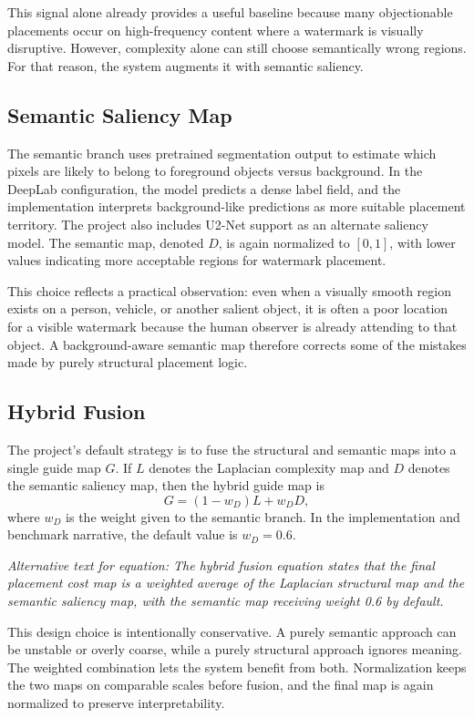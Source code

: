 \documentclass[12pt,oneside]{report}
\newcommand{\FormulaAlt}[1]{\par\small\textit{Alternative text for equation: #1}\normalsize}
\begin{document}
This signal alone already provides a useful baseline because many objectionable placements occur on high-frequency content where a watermark is visually disruptive. However, complexity alone can still choose semantically wrong regions. For that reason, the system augments it with semantic saliency.

\subsection{Semantic Saliency Map}
The semantic branch uses pretrained segmentation output to estimate which pixels are likely to belong to foreground objects versus background. In the DeepLab configuration, the model predicts a dense label field, and the implementation interprets background-like predictions as more suitable placement territory. The project also includes U2-Net support as an alternate saliency model. The semantic map, denoted $D$, is again normalized to $[0,1]$, with lower values indicating more acceptable regions for watermark placement.

This choice reflects a practical observation: even when a visually smooth region exists on a person, vehicle, or another salient object, it is often a poor location for a visible watermark because the human observer is already attending to that object. A background-aware semantic map therefore corrects some of the mistakes made by purely structural placement logic.

\subsection{Hybrid Fusion}
The project's default strategy is to fuse the structural and semantic maps into a single guide map $G$. If $L$ denotes the Laplacian complexity map and $D$ denotes the semantic saliency map, then the hybrid guide map is
\begin{equation}
G = (1 - w_D)L + w_D D,
\end{equation}
where $w_D$ is the weight given to the semantic branch. In the implementation and benchmark narrative, the default value is $w_D = 0.6$.
\FormulaAlt{The hybrid fusion equation states that the final placement cost map is a weighted average of the Laplacian structural map and the semantic saliency map, with the semantic map receiving weight 0.6 by default.}

This design choice is intentionally conservative. A purely semantic approach can be unstable or overly coarse, while a purely structural approach ignores meaning. The weighted combination lets the system benefit from both. Normalization keeps the two maps on comparable scales before fusion, and the final map is again normalized to preserve interpretability.
\end{document}

